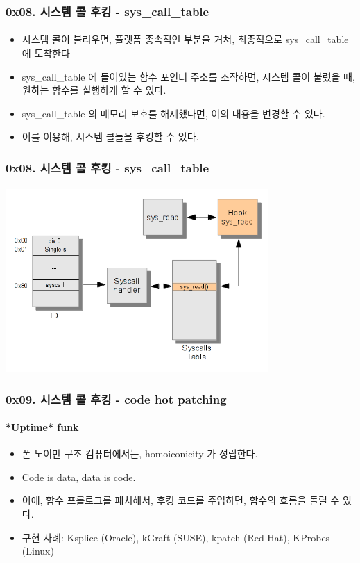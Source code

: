 \begin{frame}
  \frametitle{0x08. 시스템 콜 후킹 - sys\_call\_table}
  \framesubtitle{}

  \begin{itemize}
  \item <1-> 시스템 콜이 불리우면, 플랫폼 종속적인 부분을 거쳐, 최종적으로 sys\_call\_table 에 도착한다
  \item <2-> sys\_call\_table 에 들어있는 함수 포인터 주소를 조작하면, 시스템 콜이 불렸을 때, 원하는 함수를 실행하게 할 수 있다.
  \item <3-> sys\_call\_table 의 메모리 보호를 해제했다면, 이의 내용을 변경할 수 있다.
  \item <4-> 이를 이용해, 시스템 콜들을 후킹할 수 있다.
  \end{itemize}
\end{frame}

\begin{frame}
  \frametitle{0x08. 시스템 콜 후킹 - sys\_call\_table}
  \framesubtitle{}

  \begin{center}
    \includegraphics [width=100mm]{img/SSDT_hook_shellstorm_org.png}\cite{memorymanagement}
  \end{center}
\end{frame}

\begin{frame}
  \frametitle{0x09. 시스템 콜 후킹 - code hot patching}
  \framesubtitle{*Uptime* funk}

  \begin{itemize}
  \item <1-> 폰 노이만 구조 컴퓨터에서는, homoiconicity 가 성립한다.
  \item <1-> Code is data, data is code.
  \item <2-> 이에, 함수 프롤로그를 패치해서, 후킹 코드를 주입하면, 함수의 흐름을 돌릴 수 있다.
  \item <3-> 구현 사례: Ksplice (Oracle), kGraft (SUSE), kpatch (Red Hat), KProbes (Linux)
  \end{itemize}
\end{frame}

